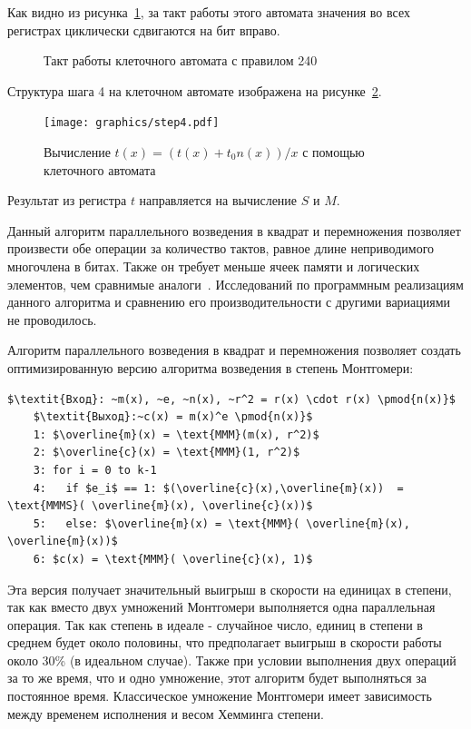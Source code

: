\documentclass[times,specification,annotation]{itmo-student-thesis}
\begin{document}
Как видно из рисунка~\ref{fig:cell}, за такт работы этого автомата значения во всех регистрах циклически сдвигаются на бит вправо.
\begin{figure}[!h]
    \caption{Такт работы клеточного автомата с правилом 240}\label{fig:cell}
\end{figure}
Структура шага 4 на клеточном автомате изображена на рисунке~\ref{fig:step4}.
\begin{figure}[!h]
    \caption{Вычисление $t(x) = (t(x) + t_0 n(x))/x$ с помощью клеточного автомата}\label{fig:step4}
    \texttt{[image: graphics/step4.pdf]}
\end{figure}
Результат из регистра $t$ направляется на вычисление $S$ и $M$.

Данный алгоритм параллельного возведения в квадрат и перемножения позволяет
произвести обе операции за количество тактов, равное длине неприводимого многочлена в битах.
Также он требует меньше ячеек памяти и логических элементов, чем сравнимые аналоги~\cite{ku04}.
Исследований по программным реализациям данного алгоритма и сравнению его производительности с другими вариациями не проводилось.

Алгоритм параллельного возведения в квадрат и перемножения позволяет создать оптимизированную версию алгоритма возведения в степень Монтгомери:
\begin{lstlisting}[breaklines=true, mathescape=true]
    $\textit{Вход}: ~m(x), ~e, ~n(x), ~r^2 = r(x) \cdot r(x) \pmod{n(x)}$
    $\textit{Выход}:~c(x) = m(x)^e \pmod{n(x)}$
    1: $\overline{m}(x) = \text{MMM}(m(x), r^2)$
    2: $\overline{c}(x) = \text{MMM}(1, r^2)$
    3: for i = 0 to k-1
    4:   if $e_i$ == 1: $(\overline{c}(x),\overline{m}(x))  = \text{MMMS}( \overline{m}(x), \overline{c}(x))$
    5:   else: $\overline{m}(x) = \text{MMM}( \overline{m}(x), \overline{m}(x))$
    6: $c(x) = \text{MMM}( \overline{c}(x), 1)$
\end{lstlisting}
Эта версия получает значительный выигрыш в скорости на единицах в степени, так как вместо двух
умножений Монтгомери выполняется одна параллельная операция.
Так как степень в идеале - случайное число, единиц в степени в среднем будет около половины,
что предполагает выигрыш в скорости работы около 30\% (в идеальном случае).
Также при условии выполнения двух операций за то же время, что и одно умножение, этот алгоритм будет выполняться за постоянное время.
Классическое умножение Монтгомери имеет зависимость между временем исполнения и весом Хемминга степени.
\end{document}
